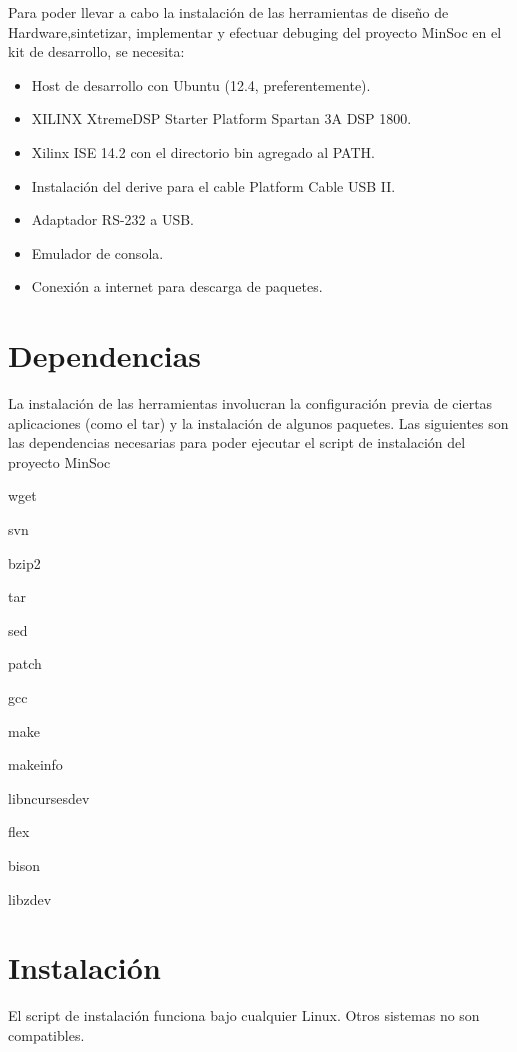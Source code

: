  Para poder llevar a cabo la instalación de las herramientas de diseño de Hardware,sintetizar, implementar y efectuar debuging  del proyecto MinSoc en el kit de desarrollo, se necesita:

\begin{itemize}
\item Host de desarrollo con Ubuntu (12.4, preferentemente).
\item XILINX XtremeDSP Starter Platform Spartan 3A DSP 1800.
\item Xilinx ISE 14.2 con el directorio bin agregado al PATH.
\item Instalación del derive para el cable Platform Cable USB II.
\item Adaptador RS-232 a USB.
\item Emulador de consola.
\item Conexión a internet para descarga de paquetes.

\end{itemize} 

\newpage

\section{Dependencias}

La instalación de las herramientas involucran la configuración previa de ciertas aplicaciones (como el tar) y la instalación de algunos paquetes.
Las siguientes son las dependencias necesarias para poder ejecutar el script de instalación del proyecto MinSoc

wget

svn

bzip2

tar

sed

patch

gcc

make

makeinfo

libncurses\-dev

flex

bison

libz\-dev 


 
\section{Instalación }

El script de instalación funciona bajo cualquier Linux. Otros sistemas no son compatibles.

